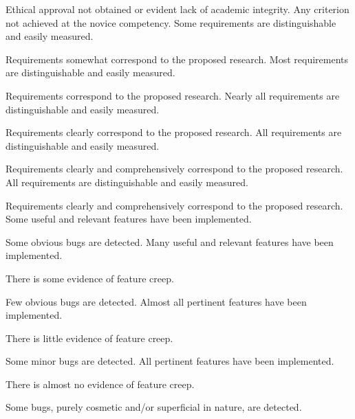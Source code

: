 \begin{markingrubric}
		\grade\fail Ethical approval not obtained or evident lack of academic integrity.
		\grade\fail Any criterion not achieved at the novice competency.
        \grade \fail 
        \grade Some requirements are distinguishable and easily measured.
            \par Requirements somewhat correspond to the proposed research.
        \grade Most requirements are distinguishable and easily measured.
            \par Requirements correspond to the proposed research.
        \grade Nearly all requirements are distinguishable and easily measured.
            \par Requirements clearly correspond to the proposed research.
        \grade All requirements are distinguishable and easily measured.
            \par Requirements clearly and comprehensively correspond to the proposed research.
        \grade All requirements are distinguishable and easily measured.
            \par Requirements clearly and comprehensively correspond to the proposed research.
%
        \grade \fail 
        \grade Some useful and relevant features have been implemented.
            \par Some obvious bugs are detected.
        \grade Many useful and relevant features have been implemented.
            \par There is some evidence of feature creep.
            \par Few obvious bugs  are detected.
        \grade Almost all pertinent features have been implemented.
            \par There is little evidence of feature creep.
            \par Some minor bugs  are detected.
        \grade All pertinent features have been implemented.
            \par There is almost no evidence of feature creep.
            \par Some bugs, purely cosmetic and/or superficial in nature, are detected.

\end{markingrubric}

